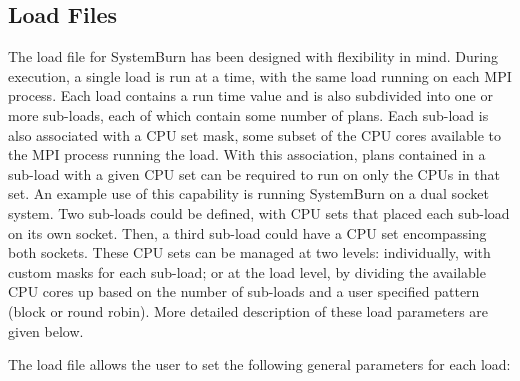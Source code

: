 \subsection{Load Files}

The load file for SystemBurn has been designed with flexibility in
mind. During execution, a single load is run at a time, with the same load
running on each MPI process. Each load contains a run time value and is
also subdivided into one or more sub-loads, each of which contain some
number of plans. Each sub-load is also associated with a CPU set mask,
some subset of the CPU cores available to the MPI process running the
load. With this association, plans contained in a sub-load with a given
CPU set can be required to run on only the CPUs in that set. An example
use of this capability is running SystemBurn on a dual socket system. Two
sub-loads could be defined, with CPU sets that placed each sub-load on
its own socket. Then, a third sub-load could have a CPU set encompassing
both sockets. These CPU sets can be managed at two levels: individually,
with custom masks for each sub-load; or at the load level, by dividing
the available CPU cores up based on the number of sub-loads and a user
specified pattern (block or round robin). More detailed description of
these load parameters are given below.

The load file allows the user to set the following general parameters
for each load:

